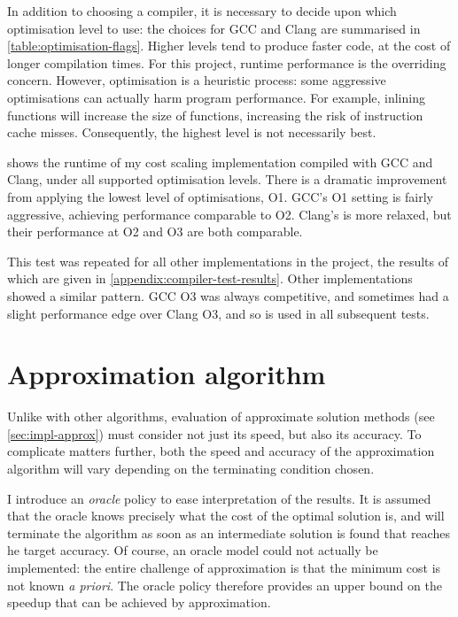 In addition to choosing a compiler, it is necessary to decide upon which optimisation level to use: the choices for GCC and Clang are summarised in \cref{table:optimisation-flags}. Higher levels tend to produce faster code, at the cost of longer compilation times. For this project, runtime performance is the overriding concern. However, optimisation is a heuristic process: some aggressive optimisations can actually harm program performance. For example, inlining functions will increase the size of functions, increasing the risk of instruction cache misses. Consequently, the highest level is not necessarily best.

 shows the runtime of my cost scaling implementation compiled with GCC and Clang, under all supported optimisation levels. There is a dramatic improvement from applying the lowest level of optimisations, O1. GCC's O1 setting is fairly aggressive, achieving performance comparable to O2. Clang's is more relaxed, but their performance at O2 and O3 are both comparable.

This test was repeated for all other implementations in the project, the results of which are given in \cref{appendix:compiler-test-results}. Other implementations showed a similar pattern\footnotemark. GCC O3 was always competitive, and sometimes had a slight performance edge over Clang O3, and so is used in all subsequent tests.

\section{Approximation algorithm} \label{sec:eval-approx}

Unlike with other algorithms, evaluation of approximate solution methods (see \cref{sec:impl-approx}) must consider not just its speed, but also its accuracy. To complicate matters further, both the speed and accuracy of the approximation algorithm will vary depending on the terminating condition chosen.

I introduce an \emph{oracle} policy to ease interpretation of the results. It is assumed that the oracle knows precisely what the cost of the optimal solution is, and will terminate the algorithm as soon as an intermediate solution is found that reaches he target accuracy. Of course, an oracle model could not actually be implemented: the entire challenge of approximation is that the minimum cost is not known \textit{a priori}. The oracle policy therefore provides an upper bound on the speedup that can be achieved by approximation.

